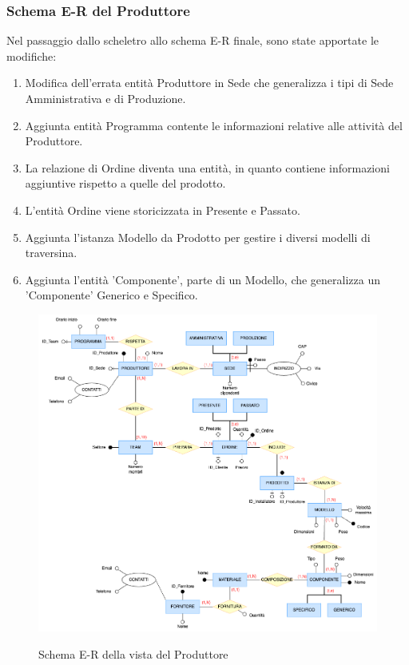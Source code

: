 \documentclass{article}
\begin{document}
\subsubsection{Schema E-R del Produttore}
Nel passaggio dallo scheletro allo schema E-R finale, sono state apportate le modifiche:
\begin{enumerate}
    \item Modifica dell'errata entità Produttore in Sede che generalizza i tipi di Sede Amministrativa e di Produzione.
    \item Aggiunta entità Programma contente le informazioni relative alle attività del Produttore.
    \item La relazione di Ordine diventa una entità, in quanto contiene informazioni aggiuntive rispetto a quelle del prodotto.
    \item L'entità Ordine viene storicizzata in Presente e Passato.
    \item Aggiunta l'istanza Modello da Prodotto per gestire i diversi modelli di traversina.
    \item Aggiunta l'entità 'Componente', parte di un Modello, che generalizza un 'Componente' Generico e Specifico.
\end{enumerate}

\begin{figure}[H]
    \centering
    \includegraphics[width=15cm]{images/rivisto_produttore.drawio.png}\\
    \caption{Schema E-R della vista del Produttore}
\end{figure}
\end{document}
